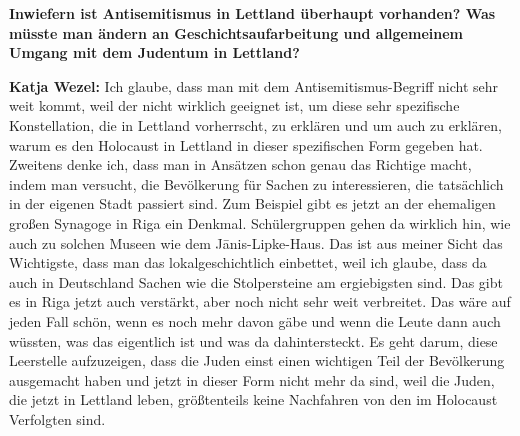 \textbf{Inwiefern ist Antisemitismus in Lettland überhaupt vorhanden? Was müsste man ändern an Geschichtsaufarbeitung und allgemeinem Umgang mit dem Judentum in Lettland?} 

\textbf{Katja Wezel:} Ich glaube, dass man mit dem Antisemitismus-Begriff nicht sehr weit kommt, weil der nicht wirklich geeignet ist, um diese sehr spezifische Konstellation, die in Lettland vorherrscht, zu erklären und um auch zu erklären, warum es den Holocaust in Lettland in dieser spezifischen Form gegeben hat. Zweitens denke ich, dass man in Ansätzen schon genau das Richtige macht, indem man versucht, die Bevölkerung für Sachen zu interessieren, die tatsächlich in der eigenen Stadt passiert sind. Zum Beispiel gibt es jetzt an der ehemaligen großen Synagoge in Riga ein Denkmal. Schülergruppen gehen da wirklich hin, wie auch zu solchen Museen wie dem Jānis-Lipke-Haus. Das ist aus meiner Sicht das Wichtigste, dass man das lokalgeschichtlich einbettet, weil ich glaube, dass da auch in Deutschland Sachen wie die Stolpersteine am ergiebigsten sind. Das gibt es in Riga jetzt auch verstärkt, aber noch nicht sehr weit verbreitet. Das wäre auf jeden Fall schön, wenn es noch mehr davon gäbe und wenn die Leute dann auch wüssten, was das eigentlich ist und was da dahintersteckt. Es geht darum, diese Leerstelle aufzuzeigen, dass die Juden einst einen wichtigen Teil der Bevölkerung ausgemacht haben und jetzt in dieser Form nicht mehr da sind, weil die Juden, die jetzt in Lettland leben, größtenteils keine Nachfahren von den im Holocaust Verfolgten sind. 